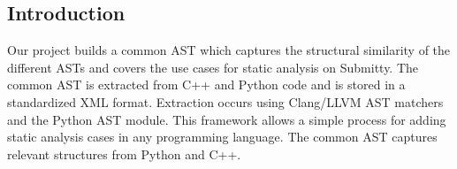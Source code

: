 \documentclass[thesis]{hmcposter}
\begin{document}
\begin{poster}
\columnbreak

\section{Introduction}
Our project builds a common AST which captures the structural similarity of the different ASTs and covers the use cases for static analysis on Submitty. The common AST is extracted from C++ and Python code and is stored in a standardized XML format. Extraction occurs using Clang/LLVM AST matchers and the Python AST module. This framework allows a simple process for adding static analysis cases in any programming language. 
The common AST captures relevant structures from Python and C++. 

\vspace{0.3in}
\begin{figure}
\begin{center}
\end{center}
\end{figure}
\vspace{0.3in}


\end{poster}
\end{document}
